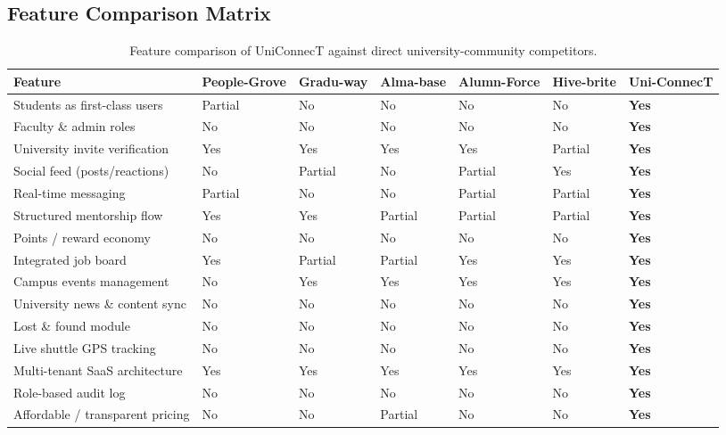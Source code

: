 \documentclass[12pt, a4paper]{article}
\begin{document}
\subsection{Feature Comparison Matrix}

\begin{table}[H]
\centering
\renewcommand{\arraystretch}{1.3}
\begin{tabular}{p{4.5cm} p{1.45cm} p{1.5cm} p{1.45cm} p{1.55cm} p{1.45cm} p{1.55cm}}
\toprule
\textbf{Feature}
  & \textbf{People-Grove}
  & \textbf{Gradu-way}
  & \textbf{Alma-base}
  & \textbf{Alumn-Force}
  & \textbf{Hive-brite}
  & \textbf{Uni-ConnecT} \\
\midrule
Students as first-class users   & Partial & No      & No      & No      & No      & \textbf{Yes} \\
Faculty \& admin roles          & No      & No      & No      & No      & No      & \textbf{Yes} \\
University invite verification  & Yes     & Yes     & Yes     & Yes     & Partial & \textbf{Yes} \\
Social feed (posts/reactions)   & No      & Partial & No      & Partial & Yes     & \textbf{Yes} \\
Real-time messaging             & Partial & No      & No      & Partial & Partial & \textbf{Yes} \\
Structured mentorship flow      & Yes     & Yes     & Partial & Partial & Partial & \textbf{Yes} \\
Points / reward economy         & No      & No      & No      & No      & No      & \textbf{Yes} \\
Integrated job board            & Yes     & Partial & Partial & Yes     & Yes     & \textbf{Yes} \\
Campus events management        & No      & Yes     & Yes     & Yes     & Yes     & \textbf{Yes} \\
University news \& content sync & No      & No      & No      & No      & No      & \textbf{Yes} \\
Lost \& found module            & No      & No      & No      & No      & No      & \textbf{Yes} \\
Live shuttle GPS tracking       & No      & No      & No      & No      & No      & \textbf{Yes} \\
Multi-tenant SaaS architecture  & Yes     & Yes     & Yes     & Yes     & Yes     & \textbf{Yes} \\
Role-based audit log            & No      & No      & No      & No      & No      & \textbf{Yes} \\
Affordable / transparent pricing & No     & No      & Partial & No      & No      & \textbf{Yes} \\
\bottomrule
\end{tabular}
\caption{Feature comparison of UniConnecT against direct university-community competitors.}
\end{table}
\end{document}
